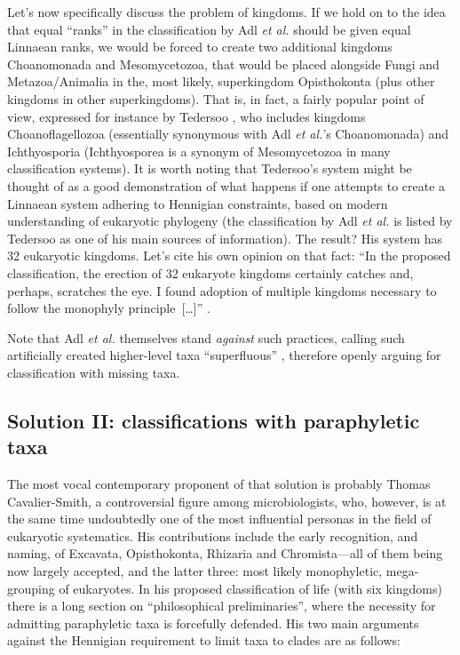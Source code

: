 \begin{artengenv}
Let’s now specifically discuss the problem of kingdoms. If we hold on to the idea that equal ``ranks'' in the
classification by Adl \textit{et al.} should be given equal Linnaean ranks, we would be forced to create two additional
kingdoms Choanomonada and Mesomycetozoa, that would be placed alongside Fungi and Metazoa/Animalia in the, most likely,
superkingdom Opisthokonta (plus other kingdoms in other superkingdoms). That is, in fact, a fairly popular point of
view, expressed for instance by Tedersoo
\parencite*{tedersoo_proposal_2017},
who includes kingdoms Choanoflagellozoa
(essentially synonymous with Adl \textit{et al.}’s Choanomonada) and Ichthyosporia (Ichthyosporea is a synonym of
Mesomycetozoa in many classification systems). It is worth noting that Tedersoo’s system might be thought of as a good
demonstration of what happens if one attempts to create a Linnaean system adhering to Hennigian constraints, based on
modern understanding of eukaryotic phylogeny (the classification by Adl \textit{et al.} is listed by Tedersoo as one of
his main sources of information). The result? His system has 32 eukaryotic kingdoms. Let’s cite his own opinion on that
fact: ``In the proposed classification, the erection of 32 eukaryote kingdoms certainly catches and, perhaps, scratches
the eye. I found adoption of multiple kingdoms necessary to follow the monophyly principle~[\ldots]''
\parencite[p.8]{tedersoo_proposal_2017}.

Note that Adl \textit{et al. }themselves stand \textit{against }such practices, calling such artificially created
higher-level taxa ``superfluous''
\parencite[p.430]{adl_revised_2012},
therefore openly arguing for
classification with missing taxa.

\subsection{Solution II: classifications with paraphyletic taxa}

The most vocal contemporary proponent of that solution is probably Thomas Cavalier-Smith, a controversial figure among
microbiologists, who, however, is at the same time undoubtedly one of the most influential personas in the field of
eukaryotic systematics. His contributions include the early recognition, and naming, of Excavata, Opisthokonta,
Rhizaria and Chromista---all of them being now largely accepted, and the latter three: most likely monophyletic,
mega-grouping of eukaryotes. In his proposed classification of life (with six kingdoms)
\parencite{cavalier-smith_revised_1998}
there is a long section on ``philosophical preliminaries'', where the
necessity for admitting paraphyletic taxa is forcefully defended. His two main arguments against the Hennigian
requirement to limit taxa to clades are as follows:


\end{artengenv}
